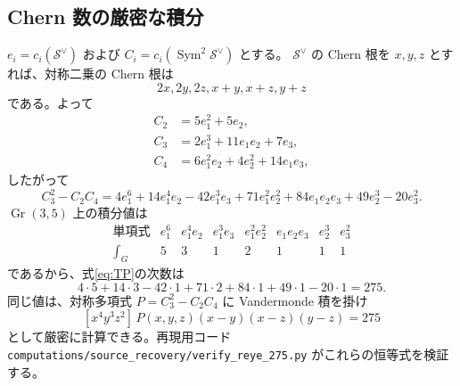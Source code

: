 \documentclass[11pt,a4paper]{ltjsarticle}
\newcommand{\Gr}{\operatorname{Gr}}
\newcommand{\Sym}{\operatorname{Sym}}
\newcommand{\cS}{\mathcal S}
\begin{document}
\subsection{Chern 数の厳密な積分}\label{sec:chern}
$e_i=c_i(\cS^\vee)$ および $C_i=c_i(\Sym^2\cS^\vee)$ とする。
$\cS^\vee$ の Chern 根を $x,y,z$ とすれば、対称二乗の Chern 根は
\[
 2x,2y,2z,x+y,x+z,y+z
\]
である。よって
\begin{align*}
 C_2&=5e_1^2+5e_2,\\
 C_3&=2e_1^3+11e_1e_2+7e_3,\\
 C_4&=6e_1^2e_2+4e_2^2+14e_1e_3,
\end{align*}
したがって
\[
 C_3^2-C_2C_4=4e_1^6+14e_1^4e_2-42e_1^3e_3
 +71e_1^2e_2^2+84e_1e_2e_3+49e_2^3-20e_3^2.
\]
$\Gr(3,5)$ 上の積分値は
\[
\begin{array}{c|rrrrrrr}
 \text{単項式}&e_1^6&e_1^4e_2&e_1^3e_3&e_1^2e_2^2&e_1e_2e_3&e_2^3&e_3^2\\\hline
 \int_G&5&3&1&2&1&1&1
\end{array}
\]
であるから、式\eqref{eq:TP}の次数は
\[
 4\cdot5+14\cdot3-42\cdot1+71\cdot2+84\cdot1+49\cdot1-20\cdot1
 =\boxed{275}.
\]
同じ値は、対称多項式 $P=C_3^2-C_2C_4$ に Vandermonde 積を掛け
\[
 [x^4y^3z^2]\,P(x,y,z)(x-y)(x-z)(y-z)=275
\]
として厳密に計算できる。再現用コード
\texttt{computations/source\_recovery/verify\_reye\_275.py} がこれらの恒等式を検証する。
\end{document}
